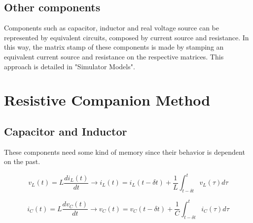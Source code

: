 \subsection{Other components}
Components such as capacitor, inductor and real voltage source can be represented by equivalent circuits, composed by current source and resistance. In this way, the matrix stamp of these components is made by stamping an equivalent current source and resistance on the respective matrices. 
This approach is detailed in "Simulator Models".

 
\section{Resistive Companion Method}

\subsection{Capacitor and Inductor}
These components need some kind of memory since their behavior is dependent on the past.

\begin{equation}
        v_L(t) = L \frac{di_L(t)}{dt} \rightarrow i_L(t) = i_L(t-\delta t)+\frac{1}{L} \int_{t-\delta t}^t v_L(\tau)d\tau
\end{equation}

\begin{equation}
        i_C(t) = L \frac{dv_C(t)}{dt} \rightarrow v_C(t) = v_C(t-\delta t)+\frac{1}{C} \int_{t-\delta t}^t i_C(\tau)d\tau
\end{equation}

